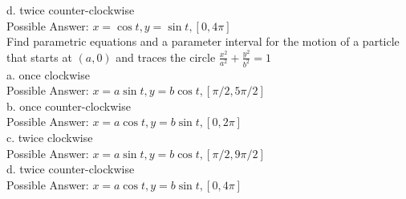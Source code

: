 \documentclass[11pt]{report}
\begin{document}
d. twice counter-clockwise\\
Possible Answer: $x=\cos t, y=\sin t, [0, 4\pi]$\\ 

Find parametric equations and a parameter interval for the motion of a particle that starts at $(a, 0)$ and traces the circle $\frac{x^2}{a^2} + \frac{y^2}{b^2} =1$\\
a. once clockwise\\
Possible Answer: $x=a\sin t, y=b \cos t, [\pi/2, 5\pi/2]$\\ 

b. once counter-clockwise\\
Possible Answer: $x=a\cos t, y=b \sin t, [0, 2\pi]$\\ 

c. twice clockwise\\
Possible Answer: $x=a\sin t, y=b \cos t, [\pi/2, 9\pi/2]$\\ 

d. twice counter-clockwise\\
Possible Answer: $x=a\cos t, y=b \sin t, [0, 4\pi]$\\ 
\end{document}

